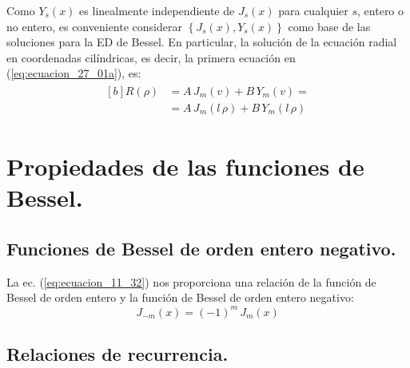 \documentclass[12pt]{article}
\numberwithin{equation}{section}
\begin{document}
\par
Como $Y_{s} (x)$ es linealmente independiente de $J_{s} (x)$ para cualquier $s$, entero o no entero,  es conveniente considerar $\left\{ J_{s} (x), Y_{s} (x) \right\}$ como base de las soluciones para la ED de Bessel. En particular, la solución de la ecuación radial en coordenadas cilíndricas, es decir, la primera ecuación en (\ref{eq:ecuacion_27_01a}), es:
\begin{align}
\begin{aligned}[b]
R (\rho) &= A \, J_{m} (v) + B \, Y_{m} (v) = \\[0.5em]  
&= A \, J_{m} (l \, \rho) + B \, Y_{m} (l \, \rho)
\end{aligned}
\label{eq:ecuacion_27_13}
\end{align}

\section{Propiedades de las funciones de Bessel.}
\subsection{Funciones de Bessel de orden entero negativo.}

La ec. (\ref{eq:ecuacion_11_32}) nos proporciona una relación de la función de Bessel de orden entero y la función de Bessel de orden entero negativo:
\begin{equation}
J_{-m} (x) = (-1)^{m} \, J_{m} (x)
\label{eq:ecuacion_27_14}
\end{equation}

\subsection{Relaciones de recurrencia.}
\end{document}
